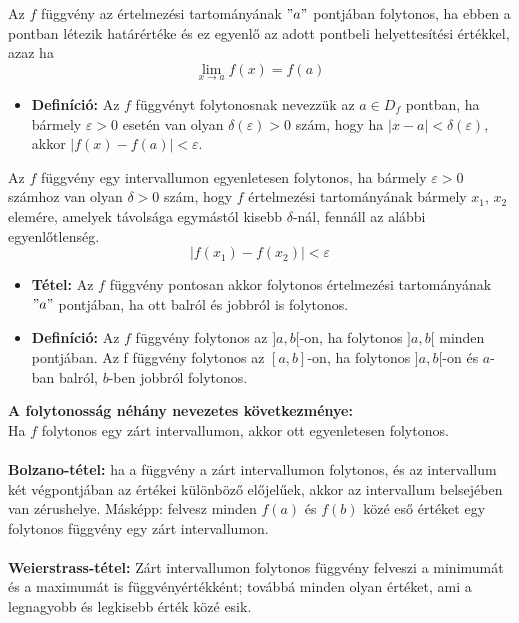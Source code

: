 \documentclass[11pt,a4paper]{article}
\begin{document}
\begin{tcolorbox}[colback=green!5!white,colframe=green!60!black,title= 3. Függvény folytonosság]
    Az \(f\) függvény az értelmezési tartományának \("a"\) pontjában folytonos, ha ebben a pontban
létezik határértéke és ez egyenlő az adott pontbeli helyettesítési értékkel, azaz ha
$$\lim_{x \to a} f(x) = f(a) $$
    \begin{itemize}
        \item \textbf{Definíció:} Az \(f\) függvényt folytonosnak nevezzük az \(a \in D_f\) pontban, ha bármely \(\varepsilon > 0\)
        esetén van olyan \(\delta(\varepsilon) > 0\) szám, hogy ha \(|x - a| < \delta(\varepsilon)\), akkor \(|f(x) - f(a)| < \varepsilon\).
    \end{itemize}
    Az \(f\) függvény egy intervallumon egyenletesen folytonos, ha bármely \(\varepsilon > 0\) számhoz van
    olyan \(\delta > 0\) szám, hogy \(f\) értelmezési tartományának bármely \(x_1\), \(x_2\) elemére, amelyek
    távolsága egymástól kisebb \(\delta\)-nál, fennáll az alábbi egyenlőtlenség.
    $$|f(x_1) - f(x_2)| < \varepsilon$$
    \begin{itemize}
        \item \textbf{Tétel:} Az \(f\) függvény pontosan akkor folytonos értelmezési tartományának \("a"\) pontjában, ha
        ott balról és jobbról is folytonos.
        \item \textbf{Definíció:} Az \(f\) függvény folytonos az \( ] a, b [ \)-on, ha folytonos \(]a, b[ \) minden pontjában.
        Az f függvény folytonos az \([a, b]\)-on, ha folytonos \(]a, b[\)-on és \(a\)-ban balról, \(b\)-ben
        jobbról folytonos.
    \end{itemize}
    \textbf{A folytonosság néhány nevezetes következménye:}\\
        Ha \(f\) folytonos egy zárt intervallumon, akkor ott egyenletesen folytonos.\\\\
        \textbf{Bolzano-tétel:} ha a függvény a zárt intervallumon folytonos, és az intervallum két
        végpontjában az értékei különböző előjelűek, akkor az intervallum belsejében van
        zérushelye. Másképp: felvesz minden \(f(a)\) és \(f(b)\) közé eső értéket egy folytonos függvény egy zárt intervallumon.\\\\
        \textbf{Weierstrass-tétel:} Zárt intervallumon folytonos függvény felveszi a minimumát és a
        maximumát is függvényértékként; továbbá minden olyan értéket, ami a legnagyobb és
        legkisebb érték közé esik.

\end{tcolorbox}
\end{document}
